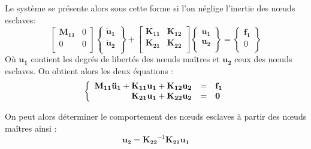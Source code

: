 \documentclass[12pt,a4paper]{report}
\begin{document}
Le système se présente alors sous cette forme si l'on néglige l'inertie des nœuds esclaves:
\begin{equation}
\begin{bmatrix}
   \mathbf{M_{11}} & 0 \\
   0 & 0 \\
\end{bmatrix}
\begin{Bmatrix}
   \mathbf{\ddot{u}_1} \\
   \mathbf{\ddot{u}_2} \\
\end{Bmatrix}
+
\begin{bmatrix}
   \mathbf{K_{11}} & \mathbf{K_{12}} \\
   \mathbf{K_{21}} & \mathbf{K_{22}} \\
\end{bmatrix}
\begin{Bmatrix}
   \mathbf{u_1} \\
   \mathbf{u_2} \\
\end{Bmatrix}
=
\begin{Bmatrix}
   \mathbf{f_1} \\
   0 \\
\end{Bmatrix}
\end{equation}
Où $\mathbf{u_1}$ contient les degrés de libertés des nœuds maîtres et $\mathbf{u_2}$ ceux des nœuds esclaves. On obtient alors les deux équations :
\begin{equation}
\left\{
\begin{array}{r c l}
	\mathbf{M_{11}}   \mathbf{\ddot{u}_1}
	+ \mathbf{K_{11}} \mathbf{u_1}
	+ \mathbf{K_{12}} \mathbf{u_2}
	& = & 
	\mathbf{f}_{\mathbf{1}}
\\
	\mathbf{K}_{\mathbf{21}} \mathbf{u_1}
	+ \mathbf{K}_{\mathbf{22}} \mathbf{u_2}
	& = & 
	\mathbf{0}

\end{array}
\right.
\end{equation}

\noindent
On peut alors déterminer le comportement des nœuds esclaves à partir des nœuds maîtres ainsi :
\begin{equation}
\label{ApproximationGuyan}
	\mathbf{u_2} = \mathbf{K_{22}}^{-1}
								\mathbf{K_{21}}
								\mathbf{u_1}
\end{equation}
\end{document}
